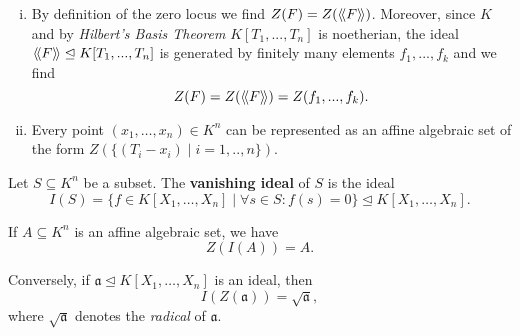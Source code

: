 	\begin{remark}
		\vspace{-1.5em}
		\begin{enumerate}[(i)]
			\item{
				By definition of the zero locus we find $Z(F) = Z(\langle\!\langle F \rangle\!\rangle)$. Moreover, since $K$ and by \textit{Hilbert's Basis Theorem} $K[T_1,...,T_n]$ is noetherian, the ideal $\langle\!\langle F \rangle\!\rangle \trianglelefteq K[T_1,...,T_n]$ is generated by finitely many elements $f_1,...,f_k$ and we find
				\begin{equation*}
					Z(F) = Z(\langle\!\langle F \rangle\!\rangle) = Z(f_1,...,f_k).
				\end{equation*}
			}
			\item{
				Every point $(x_1, \dots, x_n) \in K^n$ can be represented as an affine algebraic set of the form $Z(\{(T_i - x_i) \mid i = 1, .., n\})$.
			}
		\end{enumerate}
	\end{remark}

	\begin{definition}
		Let $S \subseteq K^n$ be a subset. The \textbf{vanishing ideal} of $S$ is the ideal 
		\begin{equation*}
			I(S) = \{f \in K[X_1, \dots, X_n] \mid \forall s \in S: f(s) = 0\} \trianglelefteq K[X_1, \dots, X_n].
		\end{equation*}
	\end{definition}

	\begin{theorem}
		If $A \subseteq K^n$ is an affine algebraic set, we have
		\begin{equation*}
			Z(I(A)) = A.
		\end{equation*}

		Conversely, if $\mathfrak{a} \trianglelefteq K[X_1, \dots, X_n]$ is an ideal, then
		\begin{equation*}
			I(Z(\mathfrak{a})) = \sqrt{\mathfrak{a}},
		\end{equation*}
		where $\sqrt{\mathfrak{a}}$ denotes the \textit{radical} of $\mathfrak{a}$.
	\end{theorem}

